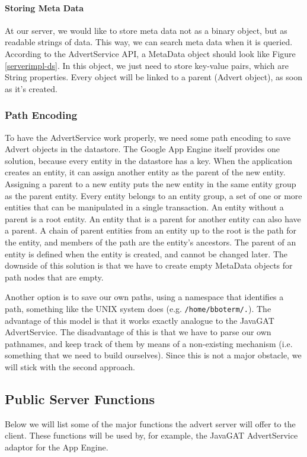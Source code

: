 \paragraph{Storing Meta Data}
At our server, we would like to store meta data not as a binary object, but as
readable strings of data. This way, we can search meta data when it is queried.
According to the AdvertService API, a MetaData object should look like Figure
\ref{serverimpl-ds}. In this object, we just need to store key-value pairs,
which are String properties. Every object will be linked to a parent (Advert
object), as soon as it's created.

\subsubsection{Path Encoding}
To have the AdvertService work properly, we need some path encoding to save
Advert objects in the datastore. The Google App Engine itself provides one
solution, because every entity in the datastore has a key. When the application
creates an entity, it can assign another entity as the parent of the new entity.
Assigning a parent to a new entity puts the new entity in the same entity group
as the parent entity. Every entity belongs to an entity group, a set of one or
more entities that can be manipulated in a single transaction. An entity without
a parent is a root entity. An entity that is a parent for another entity can also
have a parent. A chain of parent entities from an entity up to the root is the
path for the entity, and members of the path are the entity's ancestors. The
parent of an entity is defined when the entity is created, and cannot be changed
later. The downside of this solution is that we have to create empty MetaData
objects for path nodes that are empty.

Another option is to save our own paths, using a namespace that identifies a
path, something like the UNIX system does (e.g. \texttt{/home/bboterm/.}). The
advantage of this model is that it works exactly analogue to the JavaGAT
AdvertService. The disadvantage of this is that we have to parse our own
pathnames, and keep track of them by means of a non-existing mechanism (i.e.
something that we need to build ourselves). Since this is not a major obstacle,
we will stick with the second approach.

\subsection{Public Server Functions}
Below we will list some of the major functions the advert server will offer to
the client. These functions will be used by, for example, the JavaGAT
AdvertService adaptor for the App Engine.

